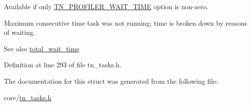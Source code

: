 Available if only {\ttfamily \hyperlink{tn__cfg__default_8h_a1c04db5457adb54f7cc38d42b29a5ad7}{T\+N\+\_\+\+P\+R\+O\+F\+I\+L\+E\+R\+\_\+\+W\+A\+I\+T\+\_\+\+T\+I\+M\+E}} option is non-\/zero. 

Maximum consecutive time task was not running; time is broken down by reasons of waiting.

\begin{DoxySeeAlso}{See also}
{\ttfamily \hyperlink{structTN__TaskTiming_a0832c998c39b3e8400ccbb386bfbc7d9}{total\+\_\+wait\+\_\+time}} 
\end{DoxySeeAlso}


Definition at line 293 of file tn\+\_\+tasks.\+h.



The documentation for this struct was generated from the following file\+:\begin{DoxyCompactItemize}
\item 
core/\hyperlink{tn__tasks_8h}{tn\+\_\+tasks.\+h}\end{DoxyCompactItemize}
